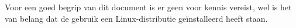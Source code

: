 Voor een goed begrip van dit document is er geen voor kennis vereist, wel is het van belang dat de gebruik een Linux-distributie ge\"installeerd heeft staan.
